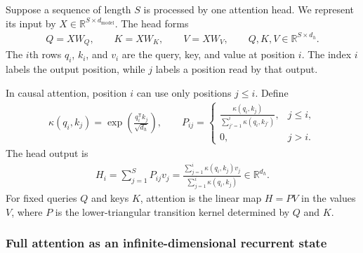 \documentclass[11pt]{article}
\newcommand{\R}{\mathbb{R}}
\begin{document}
Suppose a sequence of length $S$ is processed by one attention head.  We
represent its input by $X\in\R^{S\times d_{\mathrm{model}}}$.  The head forms
\begin{equation}
  \begin{split}
  Q=XW_Q,\qquad K=XW_K,\qquad V=XW_V,
  \qquad Q,K,V\in\R^{S\times d_h}.
  \end{split}
\end{equation}
The $i$th rows $q_i$, $k_i$, and $v_i$ are the query, key, and value at
position $i$.  The index $i$ labels the output position, while $j$ labels a
position read by that output.

In causal attention, position $i$ can use only positions $j\leq i$.  Define
\begin{equation}
  \begin{split}
  \kappa(q_i,k_j)
  =\exp\!\left(\frac{q_i^{\mathsf T}k_j}{\sqrt{d_h}}\right),
  \qquad
  P_{ij}
  =\begin{cases}
    \frac{\kappa(q_i,k_j)}
         {\sum_{j'=1}^{i}\kappa(q_i,k_{j'})}, & j\leq i,\\[9pt]
    0, & j>i.
  \end{cases}
  \label{eq:attention-transition-kernel}
  \end{split}
\end{equation}
The head output is
\begin{equation}
  \begin{split}
  H_i
  =\sum_{j=1}^{S}P_{ij}v_j
  =\frac{\sum_{j=1}^{i}\kappa(q_i,k_j)v_j}
         {\sum_{j=1}^{i}\kappa(q_i,k_j)}
  \in\R^{d_h}.
  \label{eq:full-attention}
  \end{split}
\end{equation}
For fixed queries $Q$ and keys $K$, attention is the linear map $H=PV$ in the
values $V$, where $P$ is the lower-triangular transition kernel determined by
$Q$ and $K$.

\subsubsection{Full attention as an infinite-dimensional recurrent state}
\end{document}
